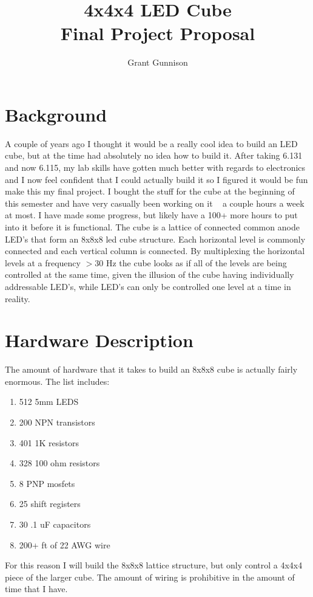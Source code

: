 \documentclass[11pt]{article} %
\title{4x4x4 LED Cube\\
\large Final Project Proposal}
\author{Grant Gunnison}
\begin{document}
\maketitle

\section{Background}

A couple of years ago I thought it would be a really cool idea to build an LED cube, but at the time had absolutely no idea how to build it. After taking 6.131 and now 6.115, my lab skills have gotten much better with regards to electronics and I now feel confident that I could actually build it so I figured it would be fun make this my final project. I bought the stuff for the cube at the beginning of this semester and have very casually been working on it ~ a couple hours a week at most. I have made some progress, but likely have a 100+ more hours to put into it before it is functional. The cube is a lattice of connected common anode LED's that form an 8x8x8 led cube structure. Each horizontal level is commonly connected and each vertical column is connected. By multiplexing the horizontal levels at a frequency $>$30 Hz the cube looks as if all of the levels are being controlled at the same time, given the illusion of the cube having individually addressable LED's, while LED's can only be controlled one level at a time in reality.

\section{Hardware Description}

The amount of hardware that it takes to build an 8x8x8 cube is actually fairly enormous. The list includes:

\begin{enumerate}
\item 512 5mm LEDS
\item 200 NPN transistors
\item 401 1K resistors
\item 328 100 ohm resistors
\item 8 PNP mosfets
\item 25 shift registers
\item 30 .1 uF capacitors
\item 200+ ft of 22 AWG wire
\end{enumerate}


For this reason I will build the 8x8x8 lattice structure, but only control a 4x4x4 piece of the larger cube. The amount of wiring is prohibitive in the amount of time that I have.\\
\end{document}
